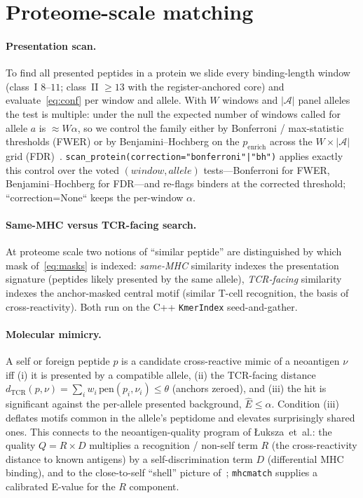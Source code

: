 \documentclass[11pt]{article}
\theoremstyle{oldplain}
\theoremstyle{oldrem}
\newcommand{\dTCR}{d_{\mathrm{TCR}}}
\begin{document}
\section{Proteome-scale matching}\label{sec:proteome}
\paragraph{Presentation scan.} To find all presented peptides in a protein we slide every
binding-length window (class~I $8$--$11$; class~II $\ge13$ with the register-anchored core) and
evaluate~\eqref{eq:conf} per window and allele. With $W$ windows and $|\mathcal A|$ panel alleles the
test is multiple: under the null the expected number of windows called for allele $a$ is
$\approx W\alpha$, so we control the family either by Bonferroni / max-statistic thresholds (FWER) or
by Benjamini--Hochberg on the $p_{\mathrm{enrich}}$ across the $W\times|\mathcal A|$ grid
(FDR)~\cite{Benjamini1995}. \texttt{scan\_protein(correction="bonferroni"|"bh")} applies exactly this
control over the voted $(window, allele)$ tests---Bonferroni for FWER, Benjamini--Hochberg for FDR---and
re-flags binders at the corrected threshold; ``correction=None`` keeps the per-window $\alpha$.

\paragraph{Same-MHC versus TCR-facing search.} At proteome scale two notions of ``similar peptide''
are distinguished by which mask of~\eqref{eq:masks} is indexed: \emph{same-MHC} similarity indexes
the presentation signature (peptides likely presented by the same allele), \emph{TCR-facing}
similarity indexes the anchor-masked central motif (similar T-cell recognition, the basis of
cross-reactivity). Both run on the C++ \texttt{KmerIndex} seed-and-gather.

\paragraph{Molecular mimicry.} A self or foreign peptide $p$ is a candidate cross-reactive mimic of a
neoantigen $\nu$ iff (i) it is presented by a compatible allele, (ii) the TCR-facing distance
$\dTCR(p,\nu)=\sum_i w_i\,\mathrm{pen}(p_i,\nu_i)\le\theta$ (anchors zeroed), and (iii) the hit is
significant against the per-allele presented background, $\widehat E\le\alpha$. Condition (iii)
deflates motifs common in the allele's peptidome and elevates surprisingly shared ones. This
connects to the neoantigen-quality program of \L{}uksza~et~al.: the quality $Q=R\times D$
\cite{Luksza2022,Luksza2017} multiplies a recognition / non-self term $R$ (the cross-reactivity
distance to known antigens) by a self-discrimination term $D$ (differential MHC binding), and to the
close-to-self ``shell'' picture of~\cite{TiffeauMayer2026}; \texttt{mhcmatch} supplies a calibrated
E-value for the $R$ component.
\end{document}
